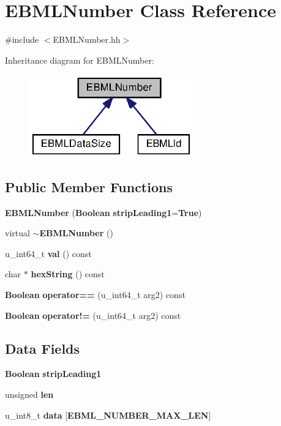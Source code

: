 \section{E\+B\+M\+L\+Number Class Reference}
\label{classEBMLNumber}


{\ttfamily \#include $<$E\+B\+M\+L\+Number.\+hh$>$}



Inheritance diagram for E\+B\+M\+L\+Number\+:
\nopagebreak
\begin{figure}[H]
\begin{center}
\leavevmode
\includegraphics[width=200pt]{classEBMLNumber__inherit__graph}
\end{center}
\end{figure}
\subsection*{Public Member Functions}
\begin{DoxyCompactItemize}
\item 
{\bf E\+B\+M\+L\+Number} ({\bf Boolean} {\bf strip\+Leading1}={\bf True})
\item 
virtual {\bf $\sim$\+E\+B\+M\+L\+Number} ()
\item 
u\+\_\+int64\+\_\+t {\bf val} () const 
\item 
char $\ast$ {\bf hex\+String} () const 
\item 
{\bf Boolean} {\bf operator==} (u\+\_\+int64\+\_\+t arg2) const 
\item 
{\bf Boolean} {\bf operator!=} (u\+\_\+int64\+\_\+t arg2) const 
\end{DoxyCompactItemize}
\subsection*{Data Fields}
\begin{DoxyCompactItemize}
\item 
{\bf Boolean} {\bf strip\+Leading1}
\item 
unsigned {\bf len}
\item 
u\+\_\+int8\+\_\+t {\bf data} [{\bf E\+B\+M\+L\+\_\+\+N\+U\+M\+B\+E\+R\+\_\+\+M\+A\+X\+\_\+\+L\+E\+N}]
\end{DoxyCompactItemize}



